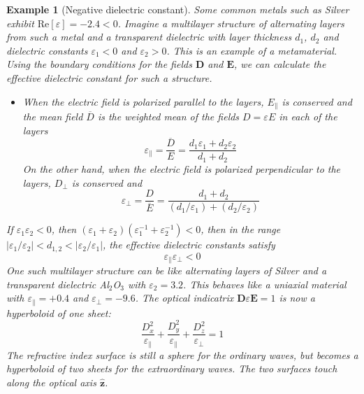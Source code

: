 \documentclass[a4paper]{article}
\newtheorem{eg}{Example}[section]
\theoremstyle{new}
\begin{document}
\begin{eg}[Negative dielectric constant]
Some common metals such as Silver exhibit $\text{Re}[\varepsilon]=-2.4<0$. Imagine a multilayer structure of alternating layers from such a metal and a transparent dielectric with layer thickness $d_1$, $d_2$ and dielectric constants $\varepsilon_1<0$ and $\varepsilon_2>0$. This is an example of a metamaterial. Using the boundary conditions for the fields $\mathbf{D}$ and $\mathbf{E}$, we can calculate the effective dielectric constant for such a structure.
\begin{itemize}
    \item When the electric field is polarized parallel to the layers, $E_\parallel$ is conserved and the mean field $\overline{D}$ is the weighted mean of the fields $D=\varepsilon E$ in each of the layers
    $$\varepsilon_\parallel=\frac{\overline{D}}{E}=\frac{d_1\varepsilon_1+d_2\varepsilon_2}{d_1+d_2}$$
    On the other hand, when the electric field is polarized perpendicular to the layers, $D_\perp$ is conserved and
    $$\varepsilon_\perp=\frac{D}{\overline{E}}=\frac{d_1+d_2}{(d_1/\varepsilon_1)+(d_2/\varepsilon_2)}$$
\end{itemize}
If $\varepsilon_1\varepsilon_2<0$, then $(\varepsilon_1+\varepsilon_2)(\varepsilon_1^{-1}+\varepsilon_2^{-1})<0$, then in the range $|\varepsilon_1/\varepsilon_2|<d_{1,2}<|\varepsilon_2/\varepsilon_1|$, the effective dielectric constants satisfy
$$\varepsilon_{\parallel}\varepsilon_\perp<0$$
One such multilayer structure can be like alternating layers of Silver and a transparent dielectric Al$_2$O$_3$ with $\varepsilon_2=3.2$. This behaves like a uniaxial material with $\varepsilon_\parallel=+0.4$ and $\varepsilon_\perp=-9.6$. The optical indicatrix $\mathbf{D}\varepsilon\mathbf{E}=1$ is now a hyperboloid of one sheet:
$$\frac{D_x^2}{\varepsilon_\parallel}+\frac{D_y^2}{\varepsilon_\parallel}+\frac{D_z^2}{\varepsilon_\perp}=1$$
The refractive index surface is still a sphere for the ordinary waves, but becomes a hyperboloid of two sheets for the extraordinary waves. The two surfaces touch along the optical axis $\mathbf{\hat{z}}$.
\end{eg}
\newpage
\end{document}
